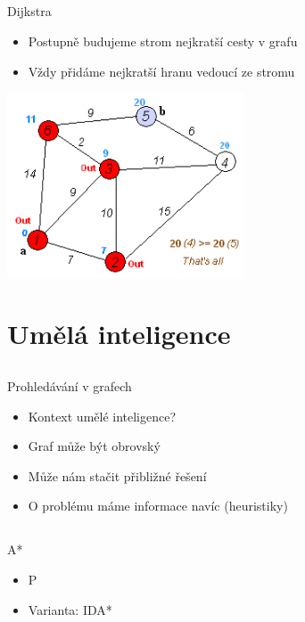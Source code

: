\documentclass{beamer}
\begin{document}
\subsection{}
\begin{frame}{Dijkstra}
\begin{itemize}
\item Postupně budujeme strom nejkratší cesty v grafu
\item Vždy přidáme nejkratší hranu vedoucí ze stromu
\end{itemize}
\begin{center}
\includegraphics[width=7cm]{dijkstra.png}
\end{center}
\end{frame}

\section{Umělá inteligence}

\subsection{}
\begin{frame}{Prohledávání v grafech}
\begin{itemize}
\item Kontext umělé inteligence?
\item Graf může být obrovský
\item Může nám stačit přibližné řešení
\item O problému máme informace navíc (heuristiky)
\end{itemize}
\end{frame}

\subsection{}
\begin{frame}{A*}
\begin{itemize}
\item P
\item Varianta: IDA*
\end{itemize}
\end{frame}
\end{document}

